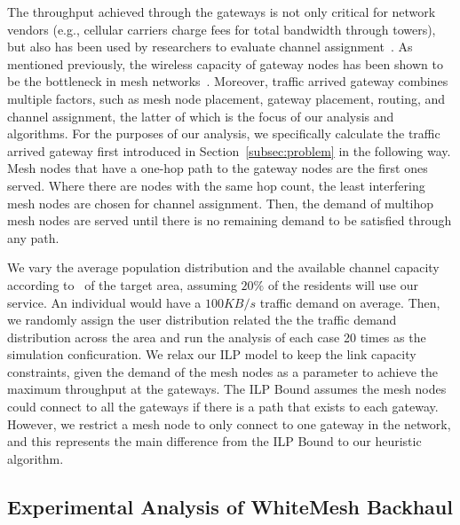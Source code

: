 The throughput achieved through the gateways is not only critical for network vendors (e.g., cellular
carriers charge fees for total bandwidth through towers), but also has been used by researchers
to evaluate channel assignment~\cite{avallone2008channel}.  As mentioned previously, the wireless
capacity of gateway nodes has been shown to be the bottleneck in mesh networks~\cite{robinson2010deploying}.
Moreover, traffic arrived gateway combines multiple factors, such as mesh node placement, gateway placement, 
routing, and channel assignment, the latter of which is the focus of our analysis and algorithms. 
For the purposes of our analysis, we specifically calculate the traffic arrived gateway first introduced
in Section~\ref{subsec:problem} in the following way.  Mesh nodes that have a one-hop path to the gateway
nodes are the first ones served. Where there are nodes with the same hop count, the least interfering
mesh nodes are chosen for channel assignment. Then, the demand of multihop mesh nodes are served 
until there is no remaining demand to be satisfied through any path.

We vary the average population distribution and the available channel capacity according to~\cite{pcuiwinmee}
 of the target area, assuming $20\%$ of the residents will use
our service. An individual would have a $100 KB/s$ traffic demand on average. Then, we randomly assign
the user distribution related the the traffic demand distribution across the area and run the analysis 
of each case 20 times as the simulation conficuration.  
We relax our ILP model to keep the link capacity constraints, given the demand of the mesh nodes as a
parameter to achieve the maximum throughput at the gateways. The ILP Bound assumes the mesh 
nodes could connect to all the gateways if there is a path that exists to each gateway. However,
we restrict a mesh node to only connect to one gateway in the network, and this represents the
main difference from the ILP Bound to our heuristic algorithm.

\subsection{Experimental Analysis of WhiteMesh Backhaul}
\label{subsec:analysis}

